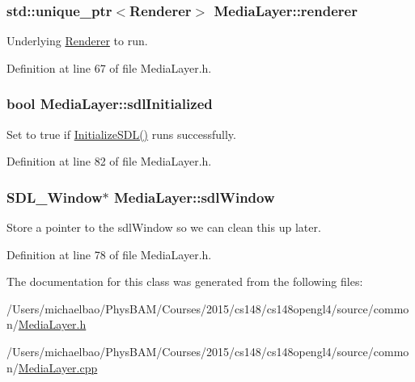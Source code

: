 \subsubsection[{renderer}]{\setlength{\rightskip}{0pt plus 5cm}std\+::unique\+\_\+ptr$<${\bf Renderer}$>$ Media\+Layer\+::renderer\hspace{0.3cm}{\ttfamily [private]}}\label{class_media_layer_aee28804a7f4e1fb771b11e93b218e387}


Underlying \hyperlink{class_renderer}{Renderer} to run. 



Definition at line 67 of file Media\+Layer.\+h.

\hypertarget{class_media_layer_ab577253a72d7d158badb3932f09e7d3f}{}
\subsubsection[{sdl\+Initialized}]{\setlength{\rightskip}{0pt plus 5cm}bool Media\+Layer\+::sdl\+Initialized\hspace{0.3cm}{\ttfamily [private]}}\label{class_media_layer_ab577253a72d7d158badb3932f09e7d3f}


Set to true if \hyperlink{class_media_layer_ad72130dbe963e351d5749a7f48b4ef97}{Initialize\+S\+D\+L()} runs successfully. 



Definition at line 82 of file Media\+Layer.\+h.

\hypertarget{class_media_layer_a769679df4457ecbe60e9668199e8788b}{}
\subsubsection[{sdl\+Window}]{\setlength{\rightskip}{0pt plus 5cm}S\+D\+L\+\_\+\+Window$\ast$ Media\+Layer\+::sdl\+Window\hspace{0.3cm}{\ttfamily [private]}}\label{class_media_layer_a769679df4457ecbe60e9668199e8788b}


Store a pointer to the sdl\+Window so we can clean this up later. 



Definition at line 78 of file Media\+Layer.\+h.



The documentation for this class was generated from the following files\+:\begin{DoxyCompactItemize}
\item 
/\+Users/michaelbao/\+Phys\+B\+A\+M/\+Courses/2015/cs148/cs148opengl4/source/common/\hyperlink{_media_layer_8h}{Media\+Layer.\+h}\item 
/\+Users/michaelbao/\+Phys\+B\+A\+M/\+Courses/2015/cs148/cs148opengl4/source/common/\hyperlink{_media_layer_8cpp}{Media\+Layer.\+cpp}\end{DoxyCompactItemize}
